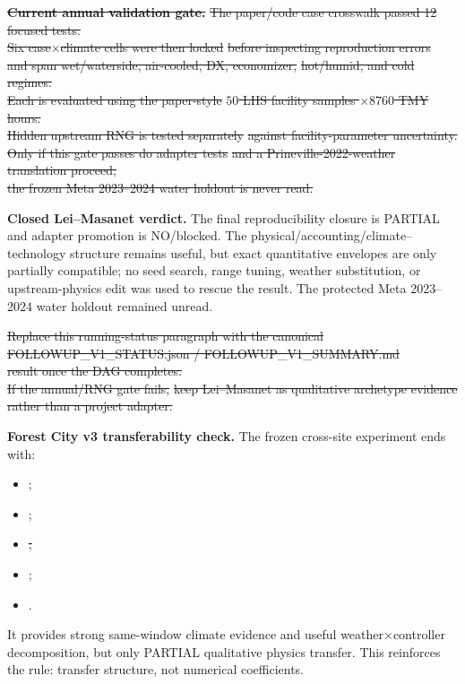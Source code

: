 \documentclass[11pt]{article}
\newcommand{\oldtxt}[1]{\textcolor{blue!70!black}{\sout{#1}}}
\newcommand{\latesttxt}[1]{\textcolor{purple!85!black}{#1}}
\begin{document}
{\color{purple!85!black}

}

{\small
\oldtxt{\textbf{Current annual validation gate.}} \oldtxt{The paper/code case crosswalk passed 12 focused tests.}\\
\oldtxt{Six case\(\times\)climate cells were then locked} \oldtxt{before inspecting reproduction errors}\\
\oldtxt{and span wet/waterside, air-cooled, DX, economizer,} \oldtxt{hot/humid, and cold regimes.}\\
\oldtxt{Each is evaluated using the paper-style} \oldtxt{\(50\) LHS facility samples \(\times 8760\) TMY hours.}\\
\oldtxt{Hidden upstream RNG is tested separately} \oldtxt{against facility-parameter uncertainty.}\\
\oldtxt{Only if this gate passes do adapter tests} \oldtxt{and a Prineville-2022-weather translation proceed;}\\
\oldtxt{the frozen Meta 2023--2024 water holdout is never read.}\par}

\latesttxt{\textbf{Closed Lei--Masanet verdict.} The final reproducibility closure is PARTIAL and adapter promotion is NO/blocked. The physical/accounting/climate--technology structure remains useful, but exact quantitative envelopes are only partially compatible; no seed search, range tuning, weather substitution, or upstream-physics edit was used to rescue the result. The protected Meta 2023--2024 water holdout remained unread.}

{\small
\oldtxt{Replace this running-status paragraph with the canonical}\\
\oldtxt{FOLLOWUP\_V1\_STATUS.json / FOLLOWUP\_V1\_SUMMARY.md}\\
\oldtxt{result once the DAG completes.}\\
\oldtxt{If the annual/RNG gate fails,} \oldtxt{keep Lei--Masanet as qualitative archetype evidence}\\
\oldtxt{rather than a project adapter.}\par}

{\color{purple!85!black}
\textbf{Forest City v3 transferability check.} The frozen cross-site experiment ends with:
\begin{itemize}
\item {};
\item {};
\item \oldtxt{;}
\item \latesttxt{;}
\item {}.
\end{itemize}
It provides strong same-window climate evidence and useful weather\(\times\)controller decomposition, but only PARTIAL qualitative physics transfer. This reinforces the rule: transfer structure, not numerical coefficients.
}
\end{document}
